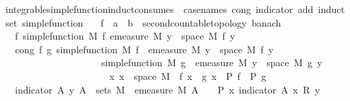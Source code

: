 \begin{isabellebody}
\ integrable{\isacharunderscore}{\kern0pt}simple{\isacharunderscore}{\kern0pt}function{\isacharunderscore}{\kern0pt}induct{\isacharbrackleft}{\kern0pt}consumes\ {}{\isacharcomma}{\kern0pt}\ case{\isacharunderscore}{\kern0pt}names\ cong\ indicator\ add{\isacharcomma}{\kern0pt}\ induct\ set{\isacharcolon}{\kern0pt}\ simple{\isacharunderscore}{\kern0pt}function{\isacharbrackright}{\kern0pt}{\isacharcolon}{\kern0pt}\isanewline
\ \ \ f\ {\isacharcolon}{\kern0pt}{\isacharcolon}{\kern0pt}\ {\isachardoublequoteopen}{\isacharprime}{\kern0pt}a\ {\isasymRightarrow}\ {\isacharprime}{\kern0pt}b\ {\isacharcolon}{\kern0pt}{\isacharcolon}{\kern0pt}\ {\isacharbraceleft}{\kern0pt}second{\isacharunderscore}{\kern0pt}countable{\isacharunderscore}{\kern0pt}topology{\isacharcomma}{\kern0pt}\ banach{\isacharbraceright}{\kern0pt}{\isachardoublequoteclose}\isanewline
\ \ \ f{\isacharcolon}{\kern0pt}\ {\isachardoublequoteopen}simple{\isacharunderscore}{\kern0pt}function\ M\ f{\isachardoublequoteclose}\ {\isachardoublequoteopen}emeasure\ M\ {\isacharbraceleft}{\kern0pt}y\ {\isasymin}\ space\ M{\isachardot}{\kern0pt}\ f\ y\ {\isasymnoteq}\ {}{\isacharbraceright}{\kern0pt}\ {\isasymnoteq}\ {\isasyminfinity}{\isachardoublequoteclose}\isanewline
\ \ \ cong{\isacharcolon}{\kern0pt}\ {\isachardoublequoteopen}{\isasymAnd}f\ g{\isachardot}{\kern0pt}\ simple{\isacharunderscore}{\kern0pt}function\ M\ f\ {\isasymLongrightarrow}\ emeasure\ M\ {\isacharbraceleft}{\kern0pt}y\ {\isasymin}\ space\ M{\isachardot}{\kern0pt}\ f\ y\ {\isasymnoteq}\ {}{\isacharbraceright}{\kern0pt}\ {\isasymnoteq}\ {\isasyminfinity}\ \isanewline
\ \ \ \ \ \ \ \ \ \ \ \ \ \ \ \ \ \ \ \ {\isasymLongrightarrow}\ simple{\isacharunderscore}{\kern0pt}function\ M\ g\ {\isasymLongrightarrow}\ emeasure\ M\ {\isacharbraceleft}{\kern0pt}y\ {\isasymin}\ space\ M{\isachardot}{\kern0pt}\ g\ y\ {\isasymnoteq}\ {}{\isacharbraceright}{\kern0pt}\ {\isasymnoteq}\ {\isasyminfinity}\ \isanewline
\ \ \ \ \ \ \ \ \ \ \ \ \ \ \ \ \ \ \ \ {\isasymLongrightarrow}\ {\isacharparenleft}{\kern0pt}{\isasymAnd}x{\isachardot}{\kern0pt}\ x\ {\isasymin}\ space\ M\ {\isasymLongrightarrow}\ f\ x\ {\isacharequal}{\kern0pt}\ g\ x{\isacharparenright}{\kern0pt}\ {\isasymLongrightarrow}\ P\ f\ {\isasymLongrightarrow}\ P\ g{\isachardoublequoteclose}\isanewline
\ \ \ indicator{\isacharcolon}{\kern0pt}\ {\isachardoublequoteopen}{\isasymAnd}A\ y{\isachardot}{\kern0pt}\ A\ {\isasymin}\ sets\ M\ {\isasymLongrightarrow}\ emeasure\ M\ A\ {\isacharless}{\kern0pt}\ {\isasyminfinity}\ {\isasymLongrightarrow}\ P\ {\isacharparenleft}{\kern0pt}{\isasymlambda}x{\isachardot}{\kern0pt}\ indicator\ A\ x\ {\isacharasterisk}{\kern0pt}\isactrlsub R\ y{\isacharparenright}{\kern0pt}{\isachardoublequoteclose}\isanewline

\end{isabellebody}
